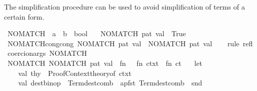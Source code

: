 \begin{isabellebody}
{}
\isamarkuptrue%
%
\endisatagdocument
{\isafolddocument}%
%
\isadelimdocument
%
\endisadelimdocument
%
\begin{isamarkuptext}%
The simplification procedure can be used to avoid simplification of terms
  of a certain form.%
\end{isamarkuptext}\isamarkuptrue%
\isamarkupfalse%
\ NO{\isacharunderscore}{\kern0pt}MATCH\ {\isacharcolon}{\kern0pt}{\isacharcolon}{\kern0pt}\ {\isachardoublequoteopen}{\isacharprime}{\kern0pt}a\ {\isasymRightarrow}\ {\isacharprime}{\kern0pt}b\ {\isasymRightarrow}\ bool{\isachardoublequoteclose}\isanewline
\ \ \ {\isachardoublequoteopen}NO{\isacharunderscore}{\kern0pt}MATCH\ pat\ val\ {\isasymequiv}\ True{\isachardoublequoteclose}\isanewline
\isanewline
{}\isamarkupfalse%
\ NO{\isacharunderscore}{\kern0pt}MATCH{\isacharunderscore}{\kern0pt}cong{\isacharbrackleft}{\kern0pt}cong{\isacharbrackright}{\kern0pt}{\isacharcolon}{\kern0pt}\ {\isachardoublequoteopen}NO{\isacharunderscore}{\kern0pt}MATCH\ pat\ val\ {\isacharequal}{\kern0pt}\ NO{\isacharunderscore}{\kern0pt}MATCH\ pat\ val{\isachardoublequoteclose}\isanewline
%
\isadelimproof
\ \ %
\endisadelimproof
%
\isatagproof
{}\isamarkupfalse%
\ {\isacharparenleft}{\kern0pt}rule\ refl{\isacharparenright}{\kern0pt}%
\endisatagproof
{\isafoldproof}%
%
\isadelimproof
\isanewline
%
\endisadelimproof
\isanewline
{}\isamarkupfalse%
\ {\isacharbrackleft}{\kern0pt}{\isacharbrackleft}{\kern0pt}coercion{\isacharunderscore}{\kern0pt}args\ NO{\isacharunderscore}{\kern0pt}MATCH\ {\isacharminus}{\kern0pt}\ {\isacharminus}{\kern0pt}{\isacharbrackright}{\kern0pt}{\isacharbrackright}{\kern0pt}\isanewline
%
\isadelimML
\isanewline
%
\endisadelimML
%
\isatagML
{}\isamarkupfalse%
\ NO{\isacharunderscore}{\kern0pt}MATCH\ {\isacharparenleft}{\kern0pt}{\isachardoublequoteopen}NO{\isacharunderscore}{\kern0pt}MATCH\ pat\ val{\isachardoublequoteclose}{\isacharparenright}{\kern0pt}\ {\isacharequal}{\kern0pt}\ {\isacartoucheopen}fn\ {\isacharunderscore}{\kern0pt}\ {\isacharequal}{\kern0pt}{\isachargreater}{\kern0pt}\ fn\ ctxt\ {\isacharequal}{\kern0pt}{\isachargreater}{\kern0pt}\ fn\ ct\ {\isacharequal}{\kern0pt}{\isachargreater}{\kern0pt}\isanewline
\ \ let\isanewline
\ \ \ \ val\ thy\ {\isacharequal}{\kern0pt}\ Proof{\isacharunderscore}{\kern0pt}Context{\isachardot}{\kern0pt}theory{\isacharunderscore}{\kern0pt}of\ ctxt\isanewline
\ \ \ \ val\ dest{\isacharunderscore}{\kern0pt}binop\ {\isacharequal}{\kern0pt}\ Term{\isachardot}{\kern0pt}dest{\isacharunderscore}{\kern0pt}comb\ {\isacharhash}{\kern0pt}{\isachargreater}{\kern0pt}\ apfst\ {\isacharparenleft}{\kern0pt}Term{\isachardot}{\kern0pt}dest{\isacharunderscore}{\kern0pt}comb\ {\isacharhash}{\kern0pt}{\isachargreater}{\kern0pt}\ snd{\isacharparenright}{\kern0pt}\isanewline

\end{isabellebody}
